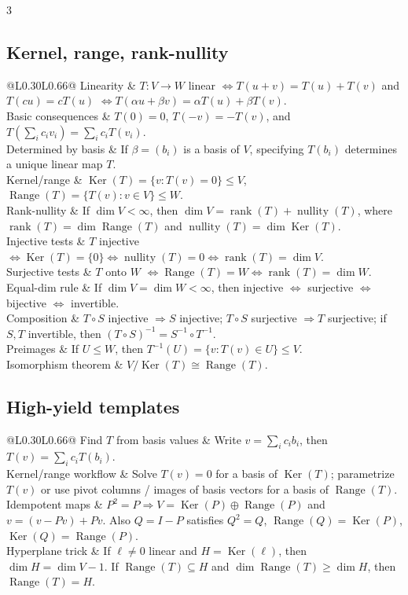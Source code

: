 \documentclass[10pt]{article}
\makeatletter
\newcommand{\Ker}{\operatorname{Ker}}
\newcommand{\Range}{\operatorname{Range}}
\newcommand{\rank}{\operatorname{rank}}
\newcommand{\nullity}{\operatorname{nullity}}
\newcommand{\cheattable}[1]{\begin{tabular}{@{}L{0.30\columnwidth}L{0.66\columnwidth}@{}}#1\end{tabular}}
\makeatother
\begin{document}
\begin{multicols}{3}
\subsection*{Kernel, range, rank-nullity}
\cheattable{
Linearity & $T:V\to W$ linear $\iff T(u+v)=T(u)+T(v)$ and $T(cu)=cT(u)$ $\iff T(\alpha u+\beta v)=\alpha T(u)+\beta T(v)$.\\
Basic consequences & $T(0)=0$, $T(-v)=-T(v)$, and $T(\sum_i c_iv_i)=\sum_i c_iT(v_i)$.\\
Determined by basis & If $\beta=(b_i)$ is a basis of $V$, specifying $T(b_i)$ determines a unique linear map $T$.\\
Kernel/range & $\Ker(T)=\{v:T(v)=0\}\le V$, $\Range(T)=\{T(v):v\in V\}\le W$.\\
Rank-nullity & If $\dim V<\infty$, then $\dim V=\rank(T)+\nullity(T)$, where $\rank(T)=\dim\Range(T)$ and $\nullity(T)=\dim\Ker(T)$.\\
Injective tests & $T$ injective $\iff \Ker(T)=\{0\} \iff \nullity(T)=0 \iff \rank(T)=\dim V$.\\
Surjective tests & $T$ onto $W$ $\iff \Range(T)=W \iff \rank(T)=\dim W$.\\
Equal-dim rule & If $\dim V=\dim W<\infty$, then injective $\iff$ surjective $\iff$ bijective $\iff$ invertible.\\
Composition & $T\circ S$ injective $\Rightarrow S$ injective; $T\circ S$ surjective $\Rightarrow T$ surjective; if $S,T$ invertible, then $(T\circ S)^{-1}=S^{-1}\circ T^{-1}$.\\
Preimages & If $U\le W$, then $T^{-1}(U)=\{v:T(v)\in U\}\le V$.\\
Isomorphism theorem & $V/\Ker(T)\cong \Range(T)$.\\
}

\subsection*{High-yield templates}
\cheattable{
Find $T$ from basis values & Write $v=\sum_i c_i b_i$, then $T(v)=\sum_i c_iT(b_i)$.\\
Kernel/range workflow & Solve $T(v)=0$ for a basis of $\Ker(T)$; parametrize $T(v)$ or use pivot columns / images of basis vectors for a basis of $\Range(T)$.\\
Idempotent maps & $P^2=P \Rightarrow V=\Ker(P)\oplus\Range(P)$ and $v=(v-Pv)+Pv$. Also $Q=I-P$ satisfies $Q^2=Q$, $\Range(Q)=\Ker(P)$, $\Ker(Q)=\Range(P)$.\\
Hyperplane trick & If $\ell\neq 0$ linear and $H=\Ker(\ell)$, then $\dim H=\dim V-1$. If $\Range(T)\subseteq H$ and $\dim\Range(T)\ge \dim H$, then $\Range(T)=H$.\\
}


\end{multicols}
\end{document}
